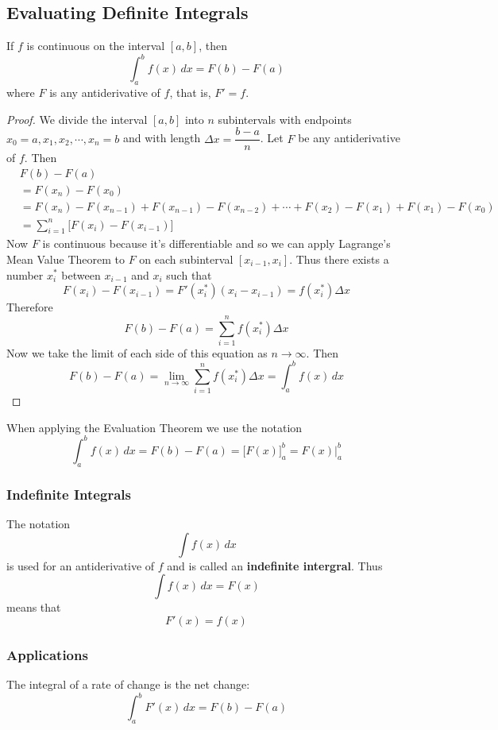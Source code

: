 \subsection{Evaluating Definite Integrals}

\begin{theorem}
    If \(f\) is continuous on the interval \([a,b]\), then
    \[\int_a^b f(x)\,dx=F(b)-F(a)\]
    where \(F\) is any antiderivative of \(f\), that is, \(F'=f\).
\end{theorem}
\begin{proof}
    We divide the interval \([a,b]\) into \(n\) subintervals with endpoints \\
    \(x_0=a,x_1,x_2,\cdots,x_n=b\) and with length
    \(\Delta x=\dfrac{b-a}{n}\).
    Let \(F\) be any antiderivative of \(f\).
    Then
    \begin{align*}
        & F(b)-F(a) \\
        &= F(x_n)-F(x_0) \\
        &= F(x_n)-F(x_{n-1})+F(x_{n-1})-F(x_{n-2})+\cdots+F(x_2)-F(x_1)+F(x_1)
        -F(x_0) \\
        &= \sum_{i=1}^n\big[F(x_i)-F(x_{i-1})\big]
    \end{align*}
    Now \(F\) is continuous because it's differentiable and so we can apply
    Lagrange's Mean Value Theorem to \(F\) on each subinterval
    \([x_{i-1},x_i]\).
    Thus there exists a number \(x_i^*\) between \(x_{i-1}\) and \(x_i\) such
    that
    \[F(x_i)-F(x_{i-1})=F'(x_i^*)(x_i-x_{i-1})=f(x_i^*)\Delta x\]
    Therefore
    \[F(b)-F(a)=\sum_{i=1}^n f(x_i^*)\Delta x\]
    Now we take the limit of each side of this equation as \(n\to\infty\).
    Then
    \[F(b)-F(a)=\lim_{n\to\infty}\sum_{i=1}^n f(x_i^*)\Delta x
    =\int_a^b f(x)\,dx\]
\end{proof}
When applying the Evaluation Theorem we use the notation
\[\int_a^b f(x)\,dx=F(b)-F(a)=\big[F(x)\big]_a^b=F(x)\Big|_a^b\]

\subsubsection*{Indefinite Integrals}
The notation
\[\int f(x)\,dx\]
is used for an antiderivative of \(f\) and is called an
\textbf{indefinite intergral}.
Thus
\[\int f(x)\,dx=F(x)\]
means that
\[F'(x)=f(x)\]

\subsubsection*{Applications}
\begin{theorem}
    The integral of a rate of change is the net change:
    \[\int_a^b F'(x)\,dx=F(b)-F(a)\]
\end{theorem}